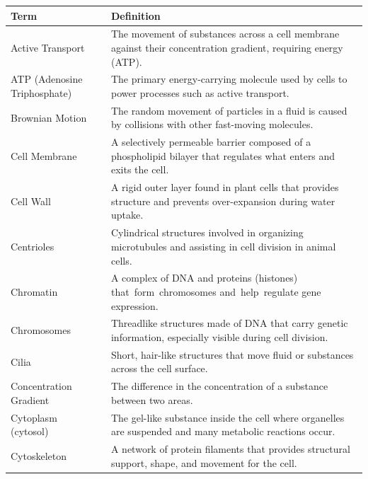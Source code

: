 \documentclass[
  letterpaper,
  DIV=11,
  numbers=noendperiod]{scrreprt}
\newcounter{none} %
\begin{document}
{\def\LTcaptype{none} %
\begin{longtable}[]{@{}
  >{\raggedright\arraybackslash}p{}
  >{\raggedright\arraybackslash}p{}@{}}
\toprule\noalign{}
\begin{minipage}[b]{\linewidth}\raggedright
\textbf{Term}
\end{minipage} & \begin{minipage}[b]{\linewidth}\raggedright
\textbf{Definition}
\end{minipage} \\
\midrule\noalign{}
\endhead
\bottomrule\noalign{}
\endlastfoot
Active Transport & The movement of substances across a cell membrane
against their concentration gradient, requiring energy (ATP). \\
ATP (Adenosine Triphosphate) & The primary energy-carrying molecule used
by cells to power processes such as active transport. \\
Brownian Motion & The random movement of particles in a fluid is caused
by collisions with other fast-moving molecules. \\
Cell Membrane & A selectively permeable barrier composed of a
phospholipid bilayer that regulates what enters and exits the cell. \\
Cell Wall & A rigid outer layer found in plant cells that provides
structure and prevents over-expansion during water uptake. \\
Centrioles~ & Cylindrical structures involved in organizing microtubules
and assisting in cell division in animal cells.~ \\
Chromatin~ & A complex of DNA and proteins (histones)
that~form~chromosomes and~help~regulate gene expression.~ \\
Chromosomes~ & Threadlike structures made of DNA that carry genetic
information, especially visible during cell division.~ \\
Cilia~ & Short, hair-like structures that move fluid or substances
across the cell surface.~ \\
Concentration Gradient & The difference in the concentration of a
substance between two areas. \\
Cytoplasm (cytosol)~ & The gel-like substance inside the cell where
organelles are suspended and many metabolic reactions occur.~ \\
Cytoskeleton~ & A network of protein filaments that provides structural
support, shape, and movement for the cell.~ \\

\end{longtable}}
\end{document}
